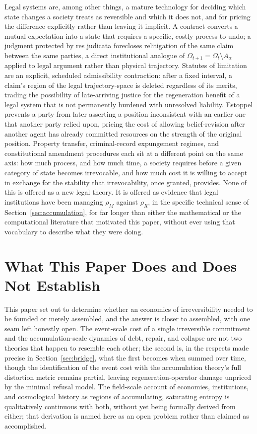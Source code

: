\documentclass[11pt]{article}
\theoremstyle{plain}
\begin{document}
Legal systems are, among other things, a mature technology for deciding which state changes a society treats as reversible and which it does not, and for pricing the difference explicitly rather than leaving it implicit. A contract converts a mutual expectation into a state that requires a specific, costly process to undo; a judgment protected by res judicata forecloses relitigation of the same claim between the same parties, a direct institutional analogue of $\Omega_{t+1} = \Omega_t \setminus A_\alpha$ applied to legal argument rather than physical trajectory. Statutes of limitation are an explicit, scheduled admissibility contraction: after a fixed interval, a claim's region of the legal trajectory-space is deleted regardless of its merits, trading the possibility of late-arriving justice for the regeneration benefit of a legal system that is not permanently burdened with unresolved liability. Estoppel prevents a party from later asserting a position inconsistent with an earlier one that another party relied upon, pricing the cost of allowing belief-revision after another agent has already committed resources on the strength of the original position. Property transfer, criminal-record expungement regimes, and constitutional amendment procedures each sit at a different point on the same axis: how much process, and how much time, a society requires before a given category of state becomes irrevocable, and how much cost it is willing to accept in exchange for the stability that irrevocability, once granted, provides. None of this is offered as a new legal theory. It is offered as evidence that legal institutions have been managing $\rho_M$ against $\rho_R$, in the specific technical sense of Section~\ref{sec:accumulation}, for far longer than either the mathematical or the computational literature that motivated this paper, without ever using that vocabulary to describe what they were doing.

\section{What This Paper Does and Does Not Establish}
\label{sec:conclusion}

This paper set out to determine whether an economics of irreversibility needed to be founded or merely assembled, and the answer is closer to assembled, with one seam left honestly open. The event-scale cost of a single irreversible commitment and the accumulation-scale dynamics of debt, repair, and collapse are not two theories that happen to resemble each other; the second is, in the respects made precise in Section~\ref{sec:bridge}, what the first becomes when summed over time, though the identification of the event cost with the accumulation theory's full distortion metric remains partial, leaving regeneration-operator damage unpriced by the minimal refusal model. The field-scale account of economies, institutions, and cosmological history as regions of accumulating, saturating entropy is qualitatively continuous with both, without yet being formally derived from either; that derivation is named here as an open problem rather than claimed as accomplished.
\end{document}
